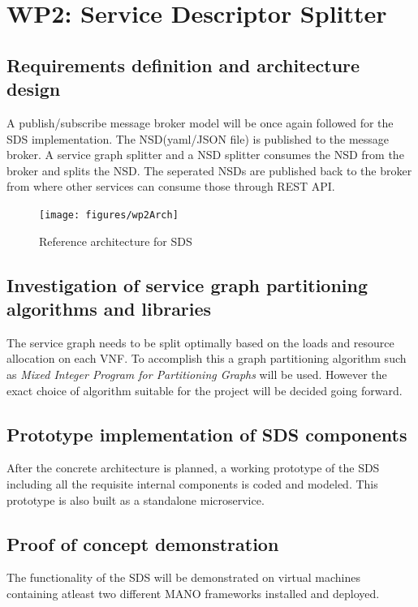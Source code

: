 \section{WP2: Service Descriptor Splitter}

\subsection{Requirements definition and architecture design}

  A publish/subscribe message broker model will be once again followed for the SDS implementation. The NSD(yaml/JSON file) is published to the message broker. A service graph splitter and a NSD splitter consumes the NSD from the broker and splits the NSD. The seperated NSDs are published back to the broker from where other services can consume those through REST API.
\begin{figure}[h]
	\centering
	\texttt{[image: figures/wp2Arch]}
	\caption{Reference architecture for SDS \cite{WPDescriptionsPDF}}
	\label{fig:wp2arch}
\end{figure}

\subsection{Investigation of service graph partitioning algorithms and libraries}

The service graph needs to be split optimally based on the loads and resource allocation on each VNF. To accomplish this a graph partitioning algorithm such as \textit{Mixed Integer Program for Partitioning Graphs} \cite{MIPPG} will be used. However the exact choice of algorithm suitable for the project will be decided going forward.
\subsection{Prototype implementation of SDS components}

After the concrete architecture is planned, a working prototype of the SDS including all the requisite internal components is coded and modeled. This prototype is also built as a standalone microservice.
\subsection{Proof of concept demonstration}

The functionality of the SDS will be demonstrated on virtual machines containing atleast two different MANO frameworks installed and deployed. 

